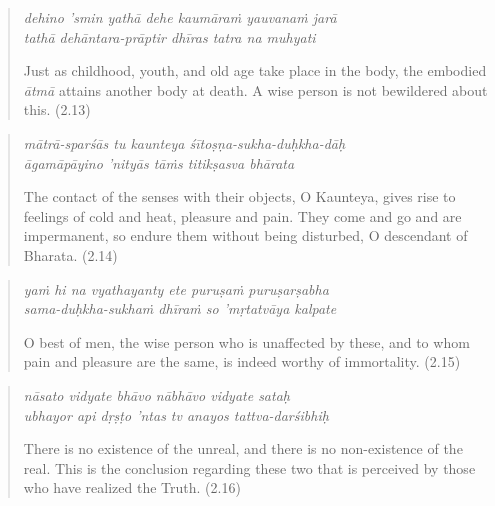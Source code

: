\documentclass[12pt, twoside, openright]{memoir}
\begin{document}
\par
\begin{verse}
\textit{dehino ’smin yathā dehe kaumāraṁ yauvanaṁ jarā} \\
\textit{tathā dehāntara-prāptir dhīras tatra na muhyati}

\noindent Just as childhood, youth, and old age take place in the body, the embodied \textit{ātmā} attains another body at death. A wise person is not bewildered about this. (2.13)
\end{verse}
\par



\par
\begin{verse}
\textit{mātrā-sparśās tu kaunteya śītoṣṇa-sukha-duḥkha-dāḥ} \\
\textit{āgamāpāyino ’nityās tāṁs titikṣasva bhārata}

\noindent The contact of the senses with their objects, O Kaunteya, gives rise to feelings of cold and heat, pleasure and pain. They come and go and are impermanent, so endure them without being disturbed, O descendant of Bharata. (2.14)
\end{verse}
\par



\par
\begin{verse}
\textit{yaṁ hi na vyathayanty ete puruṣaṁ puruṣarṣabha} \\
\textit{sama-duḥkha-sukhaṁ dhīraṁ so ’mṛtatvāya kalpate}

\noindent O best of men, the wise person who is unaffected by these, and to whom pain and pleasure are the same, is indeed worthy of immortality. (2.15)
\end{verse}
\par



\par
\begin{verse}
\textit{nāsato vidyate bhāvo nābhāvo vidyate sataḥ} \\
\textit{ubhayor api dṛṣṭo ’ntas tv anayos tattva-darśibhiḥ}

\noindent There is no existence of the unreal, and there is no non-existence of the real. This is the conclusion regarding these two that is perceived by those who have realized the Truth. (2.16)
\end{verse}
\par
\end{document}
